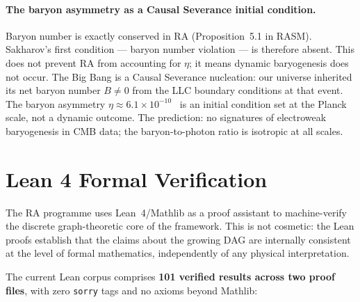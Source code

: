\documentclass[11pt,a4paper]{article}
\begin{document}
\paragraph{The baryon asymmetry as a Causal Severance initial condition.}
Baryon number is exactly conserved in RA (Proposition~5.1 in RASM).
Sakharov's first condition — baryon number violation — is therefore
absent. This does not prevent RA from accounting for $\eta$; it means
dynamic baryogenesis does not occur. The Big Bang is a Causal Severance
nucleation: our universe inherited its net baryon number $B \neq 0$
from the LLC boundary conditions at that event. The baryon asymmetry
$\eta \approx 6.1\times 10^{-10}$~\citep{PDG2022} is an initial
condition set at the Planck scale, not a dynamic outcome. The prediction:
no signatures of electroweak baryogenesis in CMB data; the
baryon-to-photon ratio is isotropic at all scales.

\section{Lean 4 Formal Verification}
\label{sec:lean}

The RA programme uses Lean~4/Mathlib as a proof assistant to machine-verify
the discrete graph-theoretic core of the framework. This is not cosmetic:
the Lean proofs establish that the claims about the growing DAG are
internally consistent at the level of formal mathematics, independently
of any physical interpretation.

The current Lean corpus comprises \textbf{101 verified results across two
proof files}, with zero \texttt{sorry} tags and no axioms beyond Mathlib:
\end{document}
